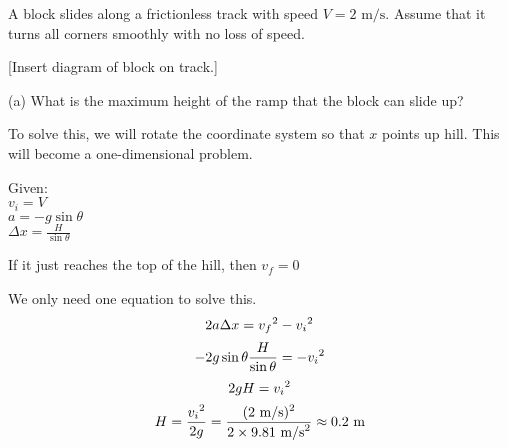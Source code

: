 A block slides along a frictionless track with speed $V=2\mbox{ m/s}$. Assume that it turns all corners smoothly with no loss of speed.

[Insert diagram of block on track.]

\vspace{6cm}

(a) What is the maximum height of the ramp that the block can slide up?

To solve this, we will rotate the coordinate system so that $x$ points up hill. This will become a one-dimensional problem.

Given:\\
$v_i=V$\\
$a=-g\sin\theta$\\
$\Delta{x}=\frac{H}{\sin\theta}$

If it just reaches the top of the hill, then $v_f=0$

We only need one equation to solve this.
$$2a\Delta{x}=v_f\displaystyle^2-v_i\displaystyle^2$$
$$-2g\sin\theta\frac{H}{\sin\theta}=-v_i\displaystyle^2$$
$$2gH=v_i\displaystyle^2$$
$$H=\frac{v_i\displaystyle^2}{2g}=\frac{(2\mbox{ m/s})\displaystyle^2}{2\times 9.81\mbox{ m/s}\displaystyle^2}\approx 0.2\mbox{ m}$$



\clearpage
